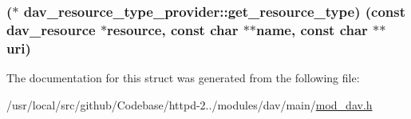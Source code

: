 \subsubsection[{\texorpdfstring{get\+\_\+resource\+\_\+type}{get_resource_type}}]{($\ast$ dav\+\_\+resource\+\_\+type\+\_\+provider\+::get\+\_\+resource\+\_\+type) (const {\bf dav\+\_\+resource} $\ast${\bf resource}, const char $\ast$$\ast${\bf name}, const char $\ast$$\ast${\bf uri})}\hypertarget{structdav__resource__type__provider_a5543267e7a44ab16585d5dc563b8b9d6}{}\label{structdav__resource__type__provider_a5543267e7a44ab16585d5dc563b8b9d6}


The documentation for this struct was generated from the following file\+:\begin{DoxyCompactItemize}
\item 
/usr/local/src/github/\+Codebase/httpd-\/2../modules/dav/main/\hyperlink{mod__dav_8h}{mod\+\_\+dav.\+h}\end{DoxyCompactItemize}

